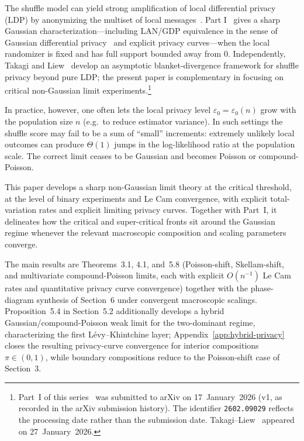 \documentclass{article}
\begin{document}
The shuffle model can yield strong amplification of local differential privacy (LDP) by anonymizing
the multiset of local messages~\cite{EFM19,CSU19,BBG19}. Part I~\cite{Shv26} gives a sharp Gaussian characterization---including LAN/GDP equivalence in the sense of Gaussian differential privacy~\cite{DRS22}
and explicit privacy curves---when the local randomizer is fixed and has full support bounded away from 0.
Independently, Takagi and Liew~\cite{TL26} develop an asymptotic blanket-divergence framework for shuffle
privacy beyond pure LDP; the present paper is complementary in focusing on critical non-Gaussian limit
experiments.\footnote{Part~I of this series~\cite{Shv26} was submitted to arXiv on 17~January~2026
(v1, as recorded in the arXiv submission history). The identifier \texttt{2602.09029} reflects the
processing date rather than the submission date. Takagi--Liew~\cite{TL26} appeared on 27~January~2026.}

In practice, however, one often lets the local privacy level $\varepsilon_0 = \varepsilon_0(n)$ grow with the population
size $n$ (e.g.\ to reduce estimator variance). In such settings the shuffle score may fail to be a sum of
``small'' increments: extremely unlikely local outcomes can produce $\Theta(1)$ jumps in the log-likelihood
ratio at the population scale. The correct limit ceases to be Gaussian and becomes Poisson or
compound-Poisson.

This paper develops a sharp non-Gaussian limit theory at the critical threshold, at the level of binary
experiments and Le Cam convergence, with explicit total-variation rates and explicit limiting privacy curves.
Together with Part~I, it delineates how the critical and super-critical fronts sit around the Gaussian regime
whenever the relevant macroscopic composition and scaling parameters converge.

The main results are Theorems~3.1, 4.1, and~5.8 (Poisson-shift, Skellam-shift, and multivariate compound-Poisson limits, each with explicit $O(n^{-1})$ Le Cam rates and quantitative privacy curve convergence) together with the phase-diagram synthesis of Section~6 under convergent macroscopic scalings. Proposition~5.4 in Section~5.2 additionally develops a hybrid Gaussian/compound-Poisson weak limit for the two-dominant regime, characterizing the first L\'evy--Khintchine layer; Appendix~\ref{app:hybrid-privacy} closes the resulting privacy-curve convergence for interior compositions $\pi\in(0,1)$, while boundary compositions reduce to the Poisson-shift case of Section~3.
\end{document}
